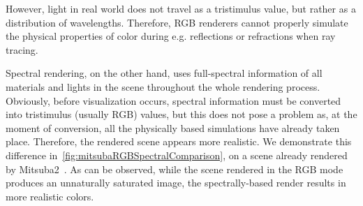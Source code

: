 However, light in real world does not travel as a tristimulus value, but rather as a distribution of wavelengths. Therefore, RGB renderers cannot properly simulate the physical properties of color during e.g. reflections or refractions when ray tracing.

Spectral rendering, on the other hand, uses full-spectral information of all materials and lights in the scene throughout the whole rendering process. Obviously, before visualization occurs, spectral information must be converted into tristimulus (usually RGB) values, but this does not pose a problem as, at the moment of conversion, all the physically based simulations have already taken place. Therefore, the rendered scene appears more realistic. We demonstrate this difference in~\cref{fig:mitsubaRGBSpectralComparison}, on a scene already rendered by Mitsuba2~\cite{Mitsuba2}. As can be observed, while the scene rendered in the RGB mode produces an unnaturally saturated image, the spectrally-based render results in more realistic colors.


